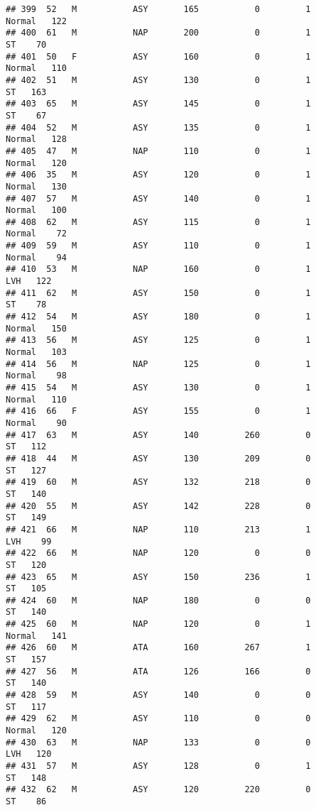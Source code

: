 \documentclass[
]{article}
\begin{document}
\begin{verbatim}
## 399  52   M           ASY       165           0         1     Normal   122
## 400  61   M           NAP       200           0         1         ST    70
## 401  50   F           ASY       160           0         1     Normal   110
## 402  51   M           ASY       130           0         1         ST   163
## 403  65   M           ASY       145           0         1         ST    67
## 404  52   M           ASY       135           0         1     Normal   128
## 405  47   M           NAP       110           0         1     Normal   120
## 406  35   M           ASY       120           0         1     Normal   130
## 407  57   M           ASY       140           0         1     Normal   100
## 408  62   M           ASY       115           0         1     Normal    72
## 409  59   M           ASY       110           0         1     Normal    94
## 410  53   M           NAP       160           0         1        LVH   122
## 411  62   M           ASY       150           0         1         ST    78
## 412  54   M           ASY       180           0         1     Normal   150
## 413  56   M           ASY       125           0         1     Normal   103
## 414  56   M           NAP       125           0         1     Normal    98
## 415  54   M           ASY       130           0         1     Normal   110
## 416  66   F           ASY       155           0         1     Normal    90
## 417  63   M           ASY       140         260         0         ST   112
## 418  44   M           ASY       130         209         0         ST   127
## 419  60   M           ASY       132         218         0         ST   140
## 420  55   M           ASY       142         228         0         ST   149
## 421  66   M           NAP       110         213         1        LVH    99
## 422  66   M           NAP       120           0         0         ST   120
## 423  65   M           ASY       150         236         1         ST   105
## 424  60   M           NAP       180           0         0         ST   140
## 425  60   M           NAP       120           0         1     Normal   141
## 426  60   M           ATA       160         267         1         ST   157
## 427  56   M           ATA       126         166         0         ST   140
## 428  59   M           ASY       140           0         0         ST   117
## 429  62   M           ASY       110           0         0     Normal   120
## 430  63   M           NAP       133           0         0        LVH   120
## 431  57   M           ASY       128           0         1         ST   148
## 432  62   M           ASY       120         220         0         ST    86

\end{verbatim}
\end{document}
